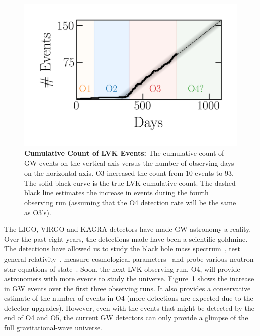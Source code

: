 \begin{figure}
\begin{center}
\centerline{\includegraphics[width=1.\linewidth]{src/figures/gw_detection_timeframe.png}}
  \caption{\textbf{Cumulative Count of LVK Events:} The cumulative count of GW events on the vertical axis versus the number of observing days on the horizontal axis. O3 increased the count from 10 events to 93. The solid black curve is the true LVK cumulative count. The dashed black line estimates the increase in events during the fourth observing run (assuming that the O4 detection rate will be the same as O3's).  }
  \label{fig:accumulation_of_gw_events}
\end{center}
\end{figure}

The LIGO, VIRGO and KAGRA detectors have made GW astronomy a reality. 
Over the past eight years, the detections made have been a scientific goldmine. 
The detections have allowed us to study the black hole mass spectrum~\cite{gwtc3_pop_inf}, test general relativity~\cite{gr_tests_gwtc3}, measure cosmological parameters~\cite{Abbott:2017:Natur, multimessenger_gw_h0, 190521_H0, Mukherjee:2022:arXiv} and probe various neutron-star equations of state~\cite{Annala:2018:PhRvL}. 
Soon, the next LVK observing run, O4, will provide astronomers with more events to study the universe. 
Figure~\ref{fig:accumulation_of_gw_events} shows the increase in GW events over the first three observing runs. 
It also provides a conservative estimate of the number of events in O4 (more detections are expected due to the detector upgrades).
However, even with the events that might be detected by the end of O4 and O5, the current GW detectors can only provide a glimpse of the full gravitational-wave universe. 

